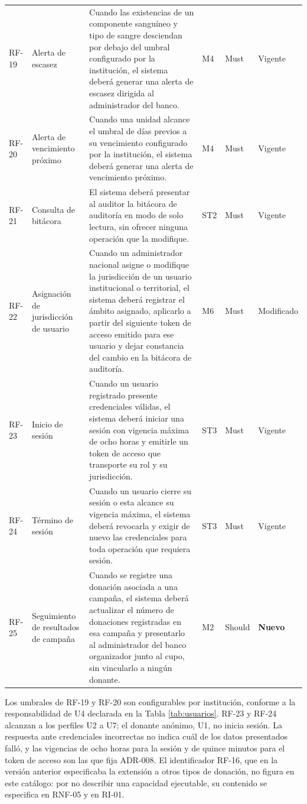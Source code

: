 \documentclass[11pt,a4paper]{article}
\newcommand{\rvig}{Vigente}
\newcommand{\rmod}{\textcolor{vinoclaro}{Modificado}}
\newcommand{\rnue}{\textcolor{vinotinto}{\textbf{Nuevo}}}
\begin{document}
\begin{longtable}{L{1.1cm} L{2.6cm} L{5.2cm} L{1.0cm} L{1.65cm} L{1.85cm}}
RF-19 & Alerta de escasez & Cuando las existencias de un componente sanguíneo y tipo de sangre desciendan por debajo del umbral configurado por la institución, el sistema deberá generar una alerta de escasez dirigida al administrador del banco. & M4 & Must & \rvig \\
RF-20 & Alerta de vencimiento próximo & Cuando una unidad alcance el umbral de días previos a su vencimiento configurado por la institución, el sistema deberá generar una alerta de vencimiento próximo. & M4 & Must & \rvig \\
RF-21 & Consulta de bitácora & El sistema deberá presentar al auditor la bitácora de auditoría en modo de solo lectura, sin ofrecer ninguna operación que la modifique. & ST2 & Must & \rvig \\
RF-22 & Asignación de jurisdicción de usuario & Cuando un administrador nacional asigne o modifique la jurisdicción de un usuario institucional o territorial, el sistema deberá registrar el ámbito asignado, aplicarlo a partir del siguiente token de acceso emitido para ese usuario y dejar constancia del cambio en la bitácora de auditoría. & M6 & Must & \rmod \\
RF-23 & Inicio de sesión & Cuando un usuario registrado presente credenciales válidas, el sistema deberá iniciar una sesión con vigencia máxima de ocho horas y emitirle un token de acceso que transporte su rol y su jurisdicción. & ST3 & Must & \rvig \\
RF-24 & Término de sesión & Cuando un usuario cierre su sesión o esta alcance su vigencia máxima, el sistema deberá revocarla y exigir de nuevo las credenciales para toda operación que requiera sesión. & ST3 & Must & \rvig \\
RF-25 & Seguimiento de resultados de campaña & Cuando se registre una donación asociada a una campaña, el sistema deberá actualizar el número de donaciones registradas en esa campaña y presentarlo al administrador del banco organizador junto al cupo, sin vincularlo a ningún donante. & M2 & Should & \rnue \\
\end{longtable}
\endgroup

\vspace{0.2cm}
\noindent Los umbrales de RF-19 y RF-20 son configurables por institución, conforme a la responsabilidad de U4 declarada en la Tabla \ref{tab:usuarios}. RF-23 y RF-24 alcanzan a los perfiles U2 a U7; el donante anónimo, U1, no inicia sesión. La respuesta ante credenciales incorrectas no indica cuál de los datos presentados falló, y las vigencias de ocho horas para la sesión y de quince minutos para el token de acceso son las que fija ADR-008. El identificador RF-16, que en la versión anterior especificaba la extensión a otros tipos de donación, no figura en este catálogo: por no describir una capacidad ejecutable, su contenido se especifica en RNF-05 y en RI-01.
\end{document}
